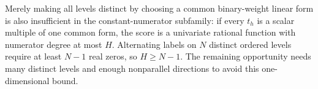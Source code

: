\documentclass[11pt]{article}
\begin{document}
Merely making all levels distinct by choosing a common binary-weight
linear form is also insufficient in the constant-numerator subfamily:
if every $t_h$ is a scalar multiple of one common form, the score is a
univariate rational function with numerator degree at most $H$. Alternating
labels on $N$ distinct ordered levels require at least $N-1$ real zeros,
so $H\geq N-1$. The remaining opportunity needs many distinct levels
and enough nonparallel directions to avoid this one-dimensional bound.
\end{document}

